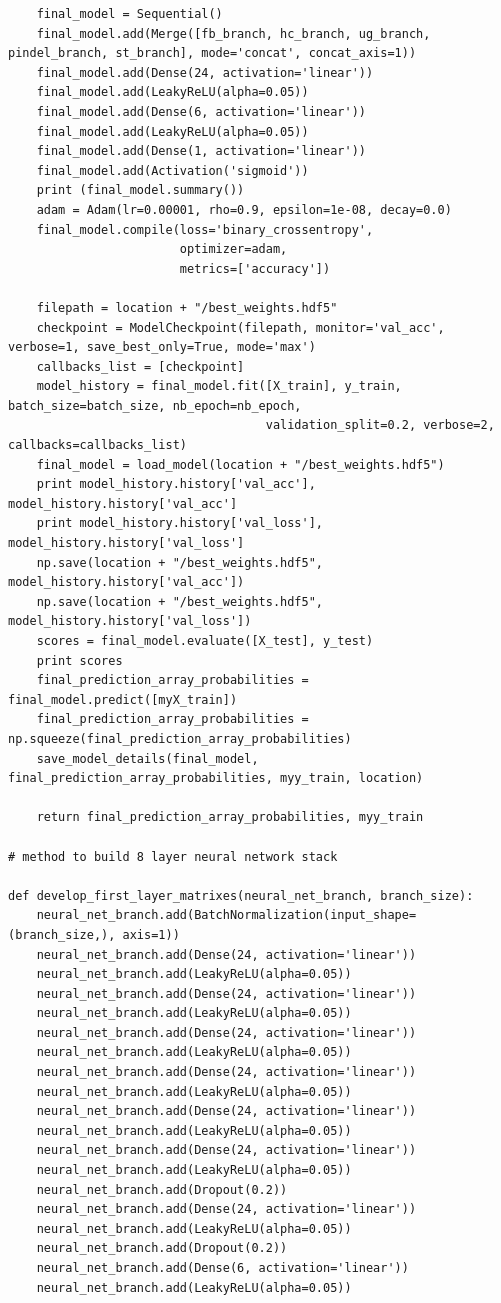 \documentclass{article}
\begin{document}
\begin{verbatim}
    final_model = Sequential()
    final_model.add(Merge([fb_branch, hc_branch, ug_branch, pindel_branch, st_branch], mode='concat', concat_axis=1))
    final_model.add(Dense(24, activation='linear'))
    final_model.add(LeakyReLU(alpha=0.05))
    final_model.add(Dense(6, activation='linear'))
    final_model.add(LeakyReLU(alpha=0.05))
    final_model.add(Dense(1, activation='linear'))
    final_model.add(Activation('sigmoid'))
    print (final_model.summary())
    adam = Adam(lr=0.00001, rho=0.9, epsilon=1e-08, decay=0.0)
    final_model.compile(loss='binary_crossentropy',
                        optimizer=adam,
                        metrics=['accuracy'])

    filepath = location + "/best_weights.hdf5"
    checkpoint = ModelCheckpoint(filepath, monitor='val_acc', verbose=1, save_best_only=True, mode='max')
    callbacks_list = [checkpoint]
    model_history = final_model.fit([X_train], y_train, batch_size=batch_size, nb_epoch=nb_epoch,
                                    validation_split=0.2, verbose=2, callbacks=callbacks_list)
    final_model = load_model(location + "/best_weights.hdf5")
    print model_history.history['val_acc'], model_history.history['val_acc']
    print model_history.history['val_loss'], model_history.history['val_loss']
    np.save(location + "/best_weights.hdf5", model_history.history['val_acc'])
    np.save(location + "/best_weights.hdf5", model_history.history['val_loss'])
    scores = final_model.evaluate([X_test], y_test)
    print scores
    final_prediction_array_probabilities = final_model.predict([myX_train])
    final_prediction_array_probabilities = np.squeeze(final_prediction_array_probabilities)
    save_model_details(final_model, final_prediction_array_probabilities, myy_train, location)

    return final_prediction_array_probabilities, myy_train

# method to build 8 layer neural network stack

def develop_first_layer_matrixes(neural_net_branch, branch_size):
    neural_net_branch.add(BatchNormalization(input_shape=(branch_size,), axis=1))
    neural_net_branch.add(Dense(24, activation='linear'))
    neural_net_branch.add(LeakyReLU(alpha=0.05))
    neural_net_branch.add(Dense(24, activation='linear'))
    neural_net_branch.add(LeakyReLU(alpha=0.05))
    neural_net_branch.add(Dense(24, activation='linear'))
    neural_net_branch.add(LeakyReLU(alpha=0.05))
    neural_net_branch.add(Dense(24, activation='linear'))
    neural_net_branch.add(LeakyReLU(alpha=0.05))
    neural_net_branch.add(Dense(24, activation='linear'))
    neural_net_branch.add(LeakyReLU(alpha=0.05))
    neural_net_branch.add(Dense(24, activation='linear'))
    neural_net_branch.add(LeakyReLU(alpha=0.05))
    neural_net_branch.add(Dropout(0.2))
    neural_net_branch.add(Dense(24, activation='linear'))
    neural_net_branch.add(LeakyReLU(alpha=0.05))
    neural_net_branch.add(Dropout(0.2))
    neural_net_branch.add(Dense(6, activation='linear'))
    neural_net_branch.add(LeakyReLU(alpha=0.05))


\end{verbatim}
\end{document}
